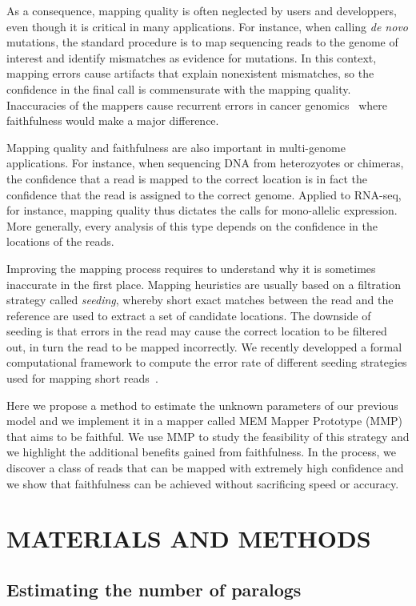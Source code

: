 \documentclass[english]{article}
\begin{document}
As a consequence, mapping quality is often neglected by users and
developpers, even though it is critical in many applications. For
instance, when calling \textit{de novo} mutations, the standard procedure
is to map sequencing reads to the genome of interest and identify
mismatches as evidence for mutations. In this context, mapping errors
cause artifacts that explain nonexistent mismatches, so the confidence in
the final call is commensurate with the mapping quality. Inaccuracies of
the mappers cause recurrent errors in cancer genomics~\cite{pmid26647970,
pmid32025007} where faithfulness would make a major difference.

Mapping quality and faithfulness are also important in multi-genome
applications. For instance, when sequencing DNA from heterozyotes or
chimeras, the confidence that a read is mapped to the correct location is
in fact the confidence that the read is assigned to the correct genome.
Applied to RNA-seq, for instance, mapping quality thus dictates the calls
for mono-allelic expression. More generally, every analysis of this type
depends on the confidence in the locations of the reads.

Improving the mapping process requires to understand why it is sometimes
inaccurate in the first place. Mapping heuristics are usually based on a
filtration strategy called \emph{seeding}, whereby short exact matches
between the read and the reference are used to extract a set of candidate
locations. The downside of seeding is that errors in the read may cause
the correct location to be filtered out, in turn the read to be mapped
incorrectly. We recently developped a formal computational framework to
compute the error rate of different seeding strategies used for mapping
short reads~\cite{Filion619155}.

Here we propose a method to estimate the unknown parameters of our
previous model and we implement it in a mapper called MEM Mapper Prototype
(MMP) that aims to be faithful. We use MMP to study the feasibility of
this strategy and we highlight the additional benefits gained from
faithfulness. In the process, we discover a class of reads that can be
mapped with extremely high confidence and we show that faithfulness can be
achieved without sacrificing speed or accuracy.


\section{MATERIALS AND METHODS}

\subsection{Estimating the number of paralogs}
\end{document}
